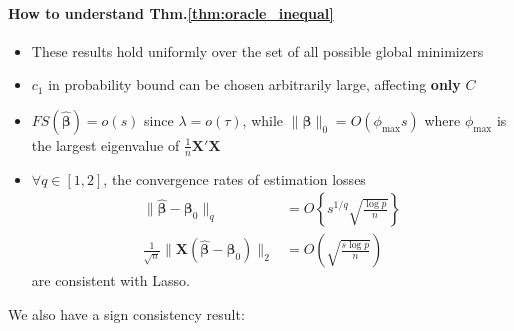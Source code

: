 \documentclass[twoside]{article}
\begin{document}
\paragraph*{How to understand Thm.\ref{thm:oracle_inequal}} 
\begin{itemize}
    \item These results hold uniformly over the set of all possible global minimizers
    \item $c_1$ in probability bound can be chosen arbitrarily large, affecting \textbf{only} $C$
    \item $FS\left(\hat{\boldsymbol{\beta}}\right) = o(s)$ since $\lambda = o(\tau)$, while $\lVert\hat{\boldsymbol{\beta}}\rVert _0 = O(\phi_{\max}s)$ where $\phi_{\max}$ is the largest eigenvalue of $\frac{1}{n}\mathbf{X}'\mathbf{X}$
    \item $\forall q \in[1,2]$, the convergence rates of estimation losses
    \begin{align*}
        \lVert \hat{\boldsymbol{\beta}} - \boldsymbol{\beta}_0\rVert _q &= O\left\{ s^{1/q} \sqrt{\frac{\log p}{n}} \right\} \\
        \frac{1}{\sqrt{n}} \lVert \mathbf{X}\left(\hat{\boldsymbol{\beta}} - \boldsymbol{\beta}_0\right)\rVert _2 &= O\left( \sqrt{\frac{s \log p}{n}} \right)
    \end{align*}
    are consistent with Lasso.
\end{itemize}
We also have a sign consistency result:
\end{document}
